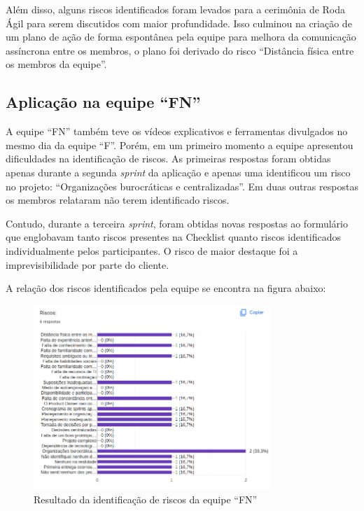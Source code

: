 \documentclass[
    12pt,       %
    openright,      %
    twoside,      %
    a4paper,      %
    english,      %
    french,       %
    spanish,      %
    brazil,       %
    ]{abntex2}
\begin{document}
Além disso, alguns riscos identificados foram levados para a cerimônia de Roda Ágil para serem discutidos com maior profundidade. Isso culminou na criação de um plano de ação de forma espontânea pela equipe para melhora da comunicação assíncrona entre os membros, o plano foi derivado do risco ``Distância física entre os membros da equipe''.

\subsection{Aplicação na equipe ``FN''}

A equipe ``FN'' também teve os vídeos explicativos e ferramentas divulgados no mesmo dia da equipe ``F''. Porém, em um primeiro momento a equipe apresentou dificuldades na identificação de riscos. As primeiras respostas foram obtidas apenas durante a segunda \textit{sprint} da aplicação e apenas uma identificou um risco no projeto: ``Organizações burocráticas e centralizadas''. Em duas outras respostas os membros relataram não terem identificado riscos.

Contudo, durante a terceira \textit{sprint}, foram obtidas novas respostas ao formulário que englobavam tanto riscos presentes na Checklist quanto riscos identificados individualmente pelos participantes. O risco de maior destaque foi a imprevisibilidade por parte do cliente.

A relação dos riscos identificados pela equipe se encontra na figura abaixo:

\begin{figure}[H]
    \centering
    \includegraphics[width=0.8\textwidth]{src/tex/img/riscos-fruit.png}
    \caption{Resultado da identificação de riscos da equipe ``FN''}
    \label{fig:risk_fruit}
\end{figure}
\end{document}
